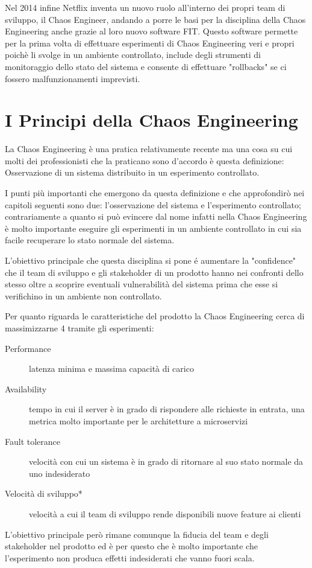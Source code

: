 Nel 2014 infine Netflix inventa un nuovo ruolo all'interno dei propri team di sviluppo, il Chaos Engineer, andando a porre le basi per la disciplina della Chaos Engineering anche grazie al loro nuovo software FIT.
Questo software permette per la prima volta di effettuare esperimenti di Chaos Engineering veri e propri poichè li svolge in un ambiente controllato, include degli strumenti di monitoraggio dello stato del sistema e consente di effettuare "rollbacks" se ci fossero malfunzionamenti imprevisti.

\section{I Principi della Chaos Engineering}

La Chaos Engineering è una pratica relativamente recente ma una cosa su cui molti dei professionisti che la praticano sono d'accordo è questa definizione: Osservazione di un sistema distribuito in un esperimento controllato.

I punti più importanti che emergono da questa definizione e che approfondirò nei capitoli seguenti sono due: l'osservazione del sistema e l'esperimento controllato; contrariamente a quanto si può evincere dal nome infatti nella Chaos Engineering è molto importante eseguire gli esperimenti in un ambiente controllato in cui sia facile recuperare lo stato normale del sistema.

L'obiettivo principale che questa disciplina si pone é aumentare la "confidence" che il team di sviluppo e gli stakeholder di un prodotto hanno nei confronti dello stesso oltre a scoprire eventuali vulnerabilità del sistema prima che esse si verifichino in un ambiente non controllato.

Per quanto riguarda le caratteristiche del prodotto la Chaos Engineering cerca di massimizzarne 4 tramite gli esperimenti:
\begin{description}
    \item[Performance] latenza minima e massima capacità di carico
    \item[Availability] tempo in cui il server è in grado di rispondere alle richieste in entrata, una metrica molto importante per le architetture a microservizi
    \item[Fault tolerance] velocità con cui un sistema è in grado di ritornare al suo stato normale da uno indesiderato
    \item[Velocità di sviluppo*] velocità a cui il team di sviluppo rende disponibili nuove feature ai clienti
\end{description}
L'obiettivo principale però rimane comunque la fiducia del team e degli stakeholder nel prodotto ed è per questo che è molto importante che l'esperimento non produca effetti indesiderati che vanno fuori scala.

